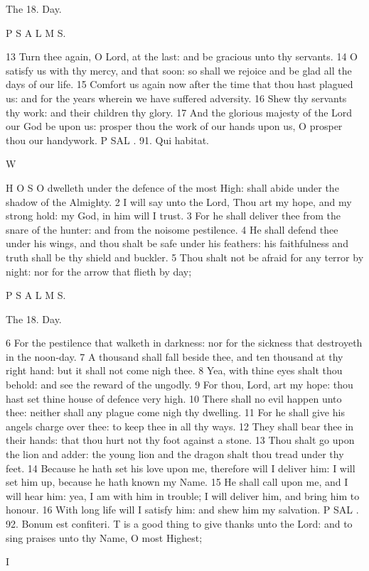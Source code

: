 The 18. Day.

P S A L M S.

13 Turn thee again, O Lord, at the last: and be gracious unto thy servants. 14 O satisfy us with thy mercy, and that soon: so shall we rejoice and be glad all the days of our life. 15 Comfort us again now after the time that thou hast plagued us: and for the years wherein we have suffered adversity. 16 Shew thy servants thy work: and their children thy glory. 17 And the glorious majesty of the Lord our God be upon us: prosper thou the work of our hands upon us, O prosper thou our handywork. P SAL . 91. Qui habitat.

W

H O S O dwelleth under the defence of the most High: shall abide under the shadow of the Almighty. 2 I will say unto the Lord, Thou art my hope, and my strong hold: my God, in him will I trust. 3 For he shall deliver thee from the snare of the hunter: and from the noisome pestilence. 4 He shall defend thee under his wings, and thou shalt be safe under his feathers: his faithfulness and truth shall be thy shield and buckler. 5 Thou shalt not be afraid for any terror by night: nor for the arrow that flieth by day;

P S A L M S.

The 18. Day.

6 For the pestilence that walketh in darkness: nor for the sickness that destroyeth in the noon-day. 7 A thousand shall fall beside thee, and ten thousand at thy right hand: but it shall not come nigh thee. 8 Yea, with thine eyes shalt thou behold: and see the reward of the ungodly. 9 For thou, Lord, art my hope: thou hast set thine house of defence very high. 10 There shall no evil happen unto thee: neither shall any plague come nigh thy dwelling. 11 For he shall give his angels charge over thee: to keep thee in all thy ways. 12 They shall bear thee in their hands: that thou hurt not thy foot against a stone. 13 Thou shalt go upon the lion and adder: the young lion and the dragon shalt thou tread under thy feet. 14 Because he hath set his love upon me, therefore will I deliver him: I will set him up, because he hath known my Name. 15 He shall call upon me, and I will hear him: yea, I am with him in trouble; I will deliver him, and bring him to honour. 16 With long life will I satisfy him: and shew him my salvation. P SAL . 92. Bonum est confiteri. T is a good thing to give thanks unto the Lord: and to sing praises unto thy Name, O most Highest;

I

